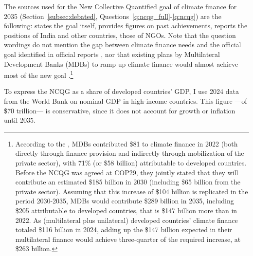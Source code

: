 The sources used for the New Collective Quantified goal of climate finance for 2035 (Section~\ref{subsec:debated}, Questions~\ref{q:ncqg_full}-\ref{q:ncqg}) are the following: \cite{unfccc_new_2024} states the goal itself, \cite{oecd_climate_2024} provides figures on past achievements, \cite{earth_negotiations_bulletin_daily_2024} reports the positions of India and other countries, \cite{climate_action_network_climate_2024,demand_climate_justice_engo-demand_2025} those of NGOs. Note that the question wordings do not mention the gap between climate finance needs and the official goal identified in official reports \citep{oecd_bridging_2024,songwe_raising_2024}, nor that existing plans by Multilateral Development Banks (MDBs) to ramp up climate finance would almost achieve most of the new goal \citep{mdbs_joint_2024}.\footnote{According to the  \cite{oecd_climate_2024}, MDBs contributed \$81 to climate finance in 2022 (both directly through finance provision and indirectly through mobilization of the private sector), with 71\% (or \$58 billion) attributable to developed countries. Before the NCQG was agreed at COP29, they jointly stated that they will contribute an estimated \$185 billion in 2030 (including \$65 billion from the private sector). Assuming that this increase of \$104 billion is replicated in the period 2030-2035, MDBs would contribute \$289 billion in 2035, including \$205 attributable to developed countries, that is \$147 billion more than in 2022. As (multilateral plus unilateral) developed countries' climate finance totaled \$116 billion in 2024, adding up the \$147 billion expected in their multilateral finance would achieve three-quarter of the required increase, at \$263 billion.}

To express the NCQG as a share of developed countries' GDP, I use 2024 data from the World Bank on nominal GDP in high-income countries. This figure ---of \$70 trillion--- is conservative, since it does not account for growth or inflation until 2035.


